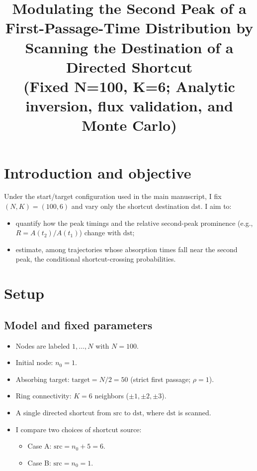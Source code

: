 \documentclass[11pt]{article}
\title{Modulating the Second Peak of a First-Passage-Time Distribution by Scanning the Destination of a Directed Shortcut\\(Fixed N=100, K=6; Analytic inversion, flux validation, and Monte Carlo)}
\author{}
\date{}
\begin{document}
\sloppy
\maketitle

\section{Introduction and objective}
Under the start/target configuration used in the main manuscript, I fix $(N,K)=(100,6)$ and vary only the shortcut destination $\mathrm{dst}$.
I aim to:
\begin{itemize}
  \item quantify how the peak timings and the relative second-peak prominence (e.g., $R=A(t_2)/A(t_1)$) change with $\mathrm{dst}$;
  \item estimate, among trajectories whose absorption times fall near the second peak, the conditional shortcut-crossing probabilities.
\end{itemize}

\section{Setup}
\subsection{Model and fixed parameters}
\begin{itemize}
  \item Nodes are labeled $1,\dots,N$ with $N=100$.
  \item Initial node: $n_0=1$.
  \item Absorbing target: $\mathrm{target}=N/2=50$ (strict first passage; $\rho=1$).
  \item Ring connectivity: $K=6$ neighbors ($\pm1,\pm2,\pm3$).
  \item A single directed shortcut from $\mathrm{src}$ to $\mathrm{dst}$, where $\mathrm{dst}$ is scanned.
  \item I compare two choices of shortcut source:
  \begin{itemize}
    \item Case A: $\mathrm{src}=n_0+5=6$.
    \item Case B: $\mathrm{src}=n_0=1$.
  \end{itemize}
\end{itemize}
\end{document}
